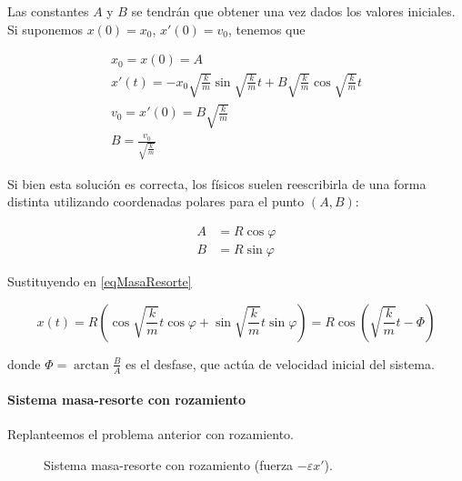 \documentclass{mathnotes}
\begin{document}
Las constantes $A$ y $B$ se tendrán que obtener una vez dados los valores iniciales. Si suponemos $x(0) = x_0$, $x'(0) = v_0$, tenemos que

\begin{gather*}
x_0 = x(0) = A \\
x'(t) = -x_0 \sqrt{\frac{k}{m}} \sin \sqrt{\frac{k}{m}} t + B \sqrt{\frac{k}{m}}\cos\sqrt{\frac{k}{m}} t \\
v_0 = x'(0) = B \sqrt{\frac{k}{m}} \\
B = \frac{v_0}{\sqrt{\frac{k}{m}}}
\end{gather*}

Si bien esta solución es correcta, los físicos suelen reescribirla de una forma distinta utilizando coordenadas polares para el punto $(A,B)$:

\begin{align*}
A &= R\cos φ \\
B &= R\sin φ 
\end{align*}

Sustituyendo en \eqref{eqMasaResorte}

\[ x(t) = R\left(\cos \sqrt{\frac{k}{m}} t\cos φ + \sin \sqrt{\frac{k}{m}} t \sin φ \right) = R\cos\left(\sqrt{\frac{k}{m}}t - Φ\right) \]

donde $Φ = \arctan \frac{B}{A}$ es el desfase, que actúa de velocidad inicial del sistema.

\paragraph{Sistema masa-resorte con rozamiento}

Replanteemos el problema anterior con rozamiento.
\begin{figure}
\centering
{}
\caption{Sistema masa-resorte con rozamiento (fuerza $-εx'$).}
\end{figure}
\end{document}
